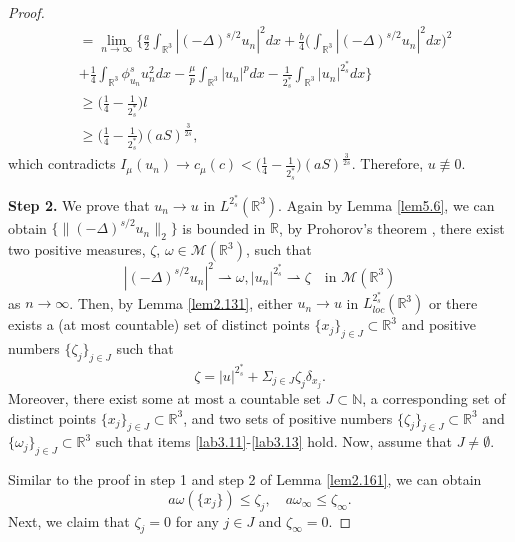 \documentclass[reqno]{amsart}
\begin{document}
\begin{proof}
\begin{align*}
&= \lim_{n\to \infty}\Big\{\frac{a}{2}\int_{\mathbb{R}^3}|(-\Delta)^{s/2}u_n|^2dx
 +\frac{b}{4}\Big(\int_{\mathbb{R}^3}|(-\Delta)^{s/2}u_n|^2dx\Big)^2 \\
&+ \frac{1}{4}\int_{\mathbb{R}^3}\phi^s_{u_n} u^2_ndx
  -\frac{\mu}{p}\int_{\mathbb{R}^3}|u_n|^pdx
  -\frac{1}{2^*_s}\int_{\mathbb{R}^3}|u_n|^{2^*_s}dx\Big\}\\
&\geq \Big(\frac{1}{4}-\frac{1}{2^*_s}\Big) l \\
&\geq \Big(\frac{1}{4}-\frac{1}{2^*_s}\Big)(aS)^{\frac{3}{2s}},
\end{align*}
which contradicts $I_\mu(u_n)\to c_\mu(c)
<\Big(\frac{1}{4}-\frac{1}{2^*_s}\Big)(aS)^{\frac{3}{2s}}$. 
Therefore, $u\not \equiv 0$.
\smallskip

\noindent\textbf{Step 2.} 
We prove that $u_n\to u$ in $L^{2^*_s}(\mathbb{R}^3)$.
Again by Lemma \ref{lem5.6}, we can obtain 
$\{\|(-\Delta)^{s/2}u_n\|_2\}$ is bounded in $\mathbb{R}$, by Prohorov's theorem 
\cite{P9899}, there exist two positive measures, $\zeta$,
 $\omega\in \mathcal{M}(\mathbb{R}^3)$, such that
\[ 
|(-\Delta)^{s/2}u_n|^2\rightharpoonup \omega, |u_n|^{2^*_s}\rightharpoonup\zeta \quad
\text{in } \mathcal{M}(\mathbb{R}^3)
\]
as $n\to \infty$. Then, by Lemma \ref{lem2.131}, either $u_n\to u$ in
$L^{2^*_s}_{loc}(\mathbb{R}^3)$ or there exists a (at most countable) set of distinct
points $\{x_j\}_{j\in J}\subset \mathbb{R}^3$ and positive numbers $\{\zeta_j\}_{j\in J}$ such that
$$
\zeta=|u|^{2^*_s}+\Sigma_{j\in J}\zeta_j \delta_{x_j}.
$$
Moreover, there exist some at most a countable set $J\subset \mathbb{N}$,
a corresponding set of distinct points $\{x_j\}_{j\in J}\subset \mathbb{R}^3$,
and two sets of positive numbers  $\{\zeta_j\}_{j\in J}\subset \mathbb{R}^3$ and
$\{\omega_j\}_{j\in J}\subset \mathbb{R}^3$ such that items
\eqref{lab3.11}-\eqref{lab3.13} hold. Now, assume that $J\neq \emptyset$.

 Similar to the proof in step 1 and step 2 of Lemma \ref{lem2.161},  we  
 can obtain
 \begin{equation}\label{4.1667}
 a\omega(\{x_j\})\leq\zeta_j,  \quad a\omega_\infty\leq\zeta_\infty.
 \end{equation}
Next, we claim that  $\zeta_j=0$ for any $j\in J$ and $\zeta_\infty=0$.


\end{proof}
\end{document}
